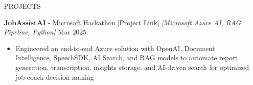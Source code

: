 \documentclass{resume} %
\begin{document}
\begin{rSection}{PROJECTS}

    \textbf{JobAssistAI} - Microsoft Hackathon [\href{https://github.com/harshitjain17/JobAssistAI}{Project Link}] \textit{[Microsoft Azure AI, RAG Pipeline, Python]} \hfill Mar 2025
    \begin{itemize}[itemsep = -4pt]
        \item Engineered an end-to-end Azure solution with OpenAI, Document Intelligence, SpeechSDK, AI Search, and RAG models to automate report generation, transcription, insights storage, and AI-driven search for optimized job coach decision-making
    \end{itemize}
    
\end{rSection}

\end{document}
